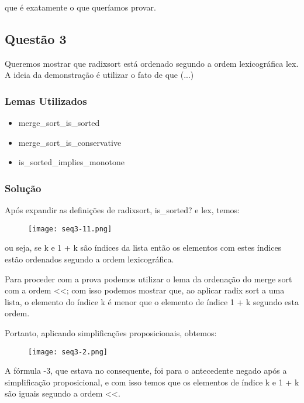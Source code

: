 \documentclass[12pt]{article}
\begin{document}
que é exatamente o que queríamos provar.

\subsection{Questão 3}

Queremos mostrar que radixsort está ordenado segundo a ordem lexicográfica lex. A ideia da demonstração é utilizar o fato de que (...)

\subsubsection{Lemas Utilizados}

\begin{itemize}
    \item merge\_sort\_is\_sorted
    \item merge\_sort\_is\_conservative
    \item is\_sorted\_implies\_monotone
\end{itemize}

\subsubsection{Solução}

Após expandir as definições de radixsort, is\_sorted? e lex, temos:

\begin{figure}[H]
    \centering
    \texttt{[image: seq3-11.png]}
    \caption{}
    \label{}
\end{figure}

ou seja, se k e 1 + k são índices da lista então os elementos com estes índices estão ordenados segundo a ordem lexicográfica.

Para proceder com a prova podemos utilizar o lema da ordenação do merge sort com a ordem <<; com isso podemos mostrar que, ao aplicar radix sort a uma lista, o elemento do índice k é menor que o elemento de índice 1 + k segundo esta ordem.

Portanto, aplicando simplificações proposicionais, obtemos:

\begin{figure}[H]
    \centering
    \texttt{[image: seq3-2.png]}
    \caption{}
    \label{}
\end{figure}


A fórmula -3, que estava no consequente, foi para o antecedente negado após a simplificação proposicional, e com isso temos que os elementos de índice k e 1 + k são iguais segundo a ordem <<. 
\end{document}
